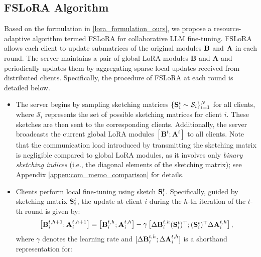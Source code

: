 \documentclass{article} %
\theoremstyle{plain}
\theoremstyle{definition}
\begin{document}
\subsection{FSLoRA Algorithm}

Based on the formulation in \eqref{lora_formulation_ours}, we propose a resource-adaptive algorithm termed FSLoRA for collaborative LLM fine-tuning. FSLoRA allows each client to update submatrices of the original modules $\bf{B}$ and $\bf{A}$ in each round.
The server maintains a pair of global LoRA modules \(\mathbf{B}\) and \(\mathbf{A}\) and periodically updates them by aggregating sparse local updates received from distributed clients.
Specifically, the procedure of FSLoRA at each round is detailed below. 

\begin{itemize}[topsep=0pt,itemsep=4pt,parsep=0pt, partopsep=0pt, leftmargin=*]
    \item The server begins by sampling sketching matrices \(\{{\bf S}_i^t \sim \mathcal{S}_i\}_{i=1}^{N}\) for all clients, where \(\mathcal{S}_i\) represents the set of possible sketching matrices for client \(i\). These sketches are then sent to the corresponding clients. Additionally, the server broadcasts the current global LoRA modules \([\mathbf{B}^{t}; \mathbf{A}^{t}]\) to all clients. Note that the communication load introduced by transmitting the sketching matrix is negligible compared to global LoRA modules, as it involves only \emph{binary sketching indices} (i.e., the diagonal elements of the sketching matrix); see Appendix \ref{appen:com_memo_comparison} for details.
    \item Clients perform local fine-tuning using sketch \({\bf S}_i^t\). 
    Specifically, guided by sketching matrix \({\bf S}_i^t\), the update at client \(i\) during the \(h\)-th iteration of the \(t\)-th round is given by:
    \begin{equation}\label{gradient_client_i}
\begin{bmatrix}
\mathbf{B}_i^{t,h+1};
\mathbf{A}_i^{t,h+1}
\end{bmatrix}
=
\begin{bmatrix}
\mathbf{B}_i^{t,h};
\mathbf{A}_i^{t,h}
\end{bmatrix}
-
\gamma 
\begin{bmatrix}
{\Delta} {\bf B}_i^{t,h} ({\bf S}_i^t)^{\top}; 
({\bf S}_i^t)^{\top} {\Delta} {\bf A}_i^{t,h}
\end{bmatrix},
\end{equation}
 where \(\gamma\) denotes the learning rate and \([{\Delta} {\bf B}_i^{t,h}; {\Delta} {\bf A}_i^{t,h}]\) is a shorthand representation for:

\end{itemize}
\end{document}
